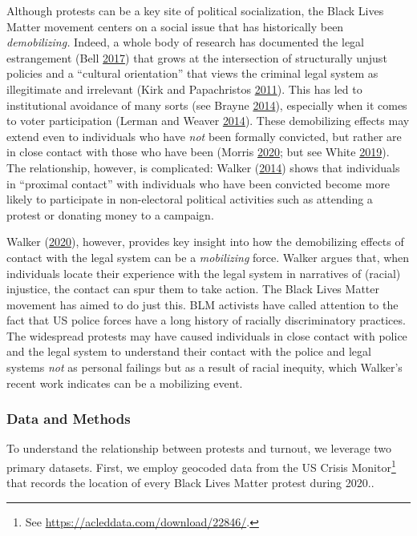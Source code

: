 \documentclass[
  12pt,
]{article}
\begin{document}
Although protests can be a key site of political socialization, the Black Lives Matter movement centers on a social issue that has historically been \emph{demobilizing.} Indeed, a whole body of research has documented the legal estrangement (Bell \protect\hyperlink{ref-Bell2017}{2017}) that grows at the intersection of structurally unjust policies and a ``cultural orientation'' that views the criminal legal system as illegitimate and irrelevant (Kirk and Papachristos \protect\hyperlink{ref-Kirk2011}{2011}). This has led to institutional avoidance of many sorts (see Brayne \protect\hyperlink{ref-Brayne2014}{2014}), especially when it comes to voter participation (Lerman and Weaver \protect\hyperlink{ref-Lerman2014}{2014}). These demobilizing effects may extend even to individuals who have \emph{not} been formally convicted, but rather are in close contact with those who have been (Morris \protect\hyperlink{ref-Morris2020}{2020}; but see White \protect\hyperlink{ref-White2019}{2019}). The relationship, however, is complicated: Walker (\protect\hyperlink{ref-Walker2014}{2014}) shows that individuals in ``proximal contact'' with individuals who have been convicted become more likely to participate in non-electoral political activities such as attending a protest or donating money to a campaign.

Walker (\protect\hyperlink{ref-Walker2020}{2020}), however, provides key insight into how the demobilizing effects of contact with the legal system can be a \emph{mobilizing} force. Walker argues that, when individuals locate their experience with the legal system in narratives of (racial) injustice, the contact can spur them to take action. The Black Lives Matter movement has aimed to do just this. BLM activists have called attention to the fact that US police forces have a long history of racially discriminatory practices. The widespread protests may have caused individuals in close contact with police and the legal system to understand their contact with the police and legal systems \emph{not} as personal failings but as a result of racial inequity, which Walker's recent work indicates can be a mobilizing event.

\hypertarget{data-and-methods}{%
\subsubsection*{Data and Methods}\label{data-and-methods}}

To understand the relationship between protests and turnout, we leverage two primary datasets. First, we employ geocoded data from the US Crisis Monitor\footnote{See \url{https://acleddata.com/download/22846/}.} that records the location of every Black Lives Matter protest during 2020..
\end{document}
